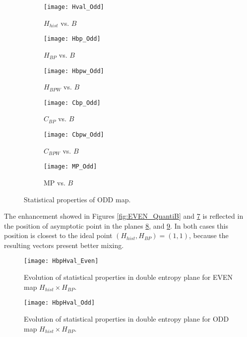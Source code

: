 %
\begin{figure}[H]
	\centering
	\begin{subfigure}[b]{0.49\textwidth}
		\texttt{[image: Hval\_Odd]}
		\caption{$H_{hist}$ vs. $B$}
		\label{fig:Hval_Odd}
	\end{subfigure}
	\begin{subfigure}[b]{0.49\textwidth}
		\texttt{[image: Hbp\_Odd]}
		\caption{$H_{BP}$ vs. $B$}
		\label{fig:Hbp_Odd}
	\end{subfigure}
	\begin{subfigure}[b]{0.49\textwidth}
		\texttt{[image: Hbpw\_Odd]}
		\caption{$H_{BPW}$ vs. $B$}
		\label{fig:Hbpw_Odd}
	\end{subfigure}
	\begin{subfigure}[b]{0.49\textwidth}
		\texttt{[image: Cbp\_Odd]}
		\caption{$C_{BP}$ vs. $B$}
		\label{fig:Cbp_Odd}
	\end{subfigure}
	\begin{subfigure}[b]{0.49\textwidth}
		\texttt{[image: Cbpw\_Odd]}
		\caption{$C_{BPW}$ vs. $B$}
		\label{fig:Cbpw_Odd}
	\end{subfigure}
	\begin{subfigure}[b]{0.49\textwidth}
		\texttt{[image: MP\_Odd]}
		\caption{MP vs. $B$}
		\label{fig:MP_Odd}
	\end{subfigure}
	\caption{Statistical properties of ODD map.}
	\label{fig:ODD_QuantiB}
\end{figure}

The enhancement showed in Figures \ref{fig:EVEN_QuantiB} and \ref{fig:ODD_QuantiB} is reflected in the position of asymptotic point in the planes \ref{fig:EVEN_HH}, and \ref{fig:ODD_HH}.
In both cases this position is closest to the ideal point $(H_{hist}, H_{BP})=(1, 1)$, because the resulting vectors present better mixing.
%
\begin{figure}[H]
	\centering
	\texttt{[image: HbpHval\_Even]}
	\caption{Evolution of statistical properties in double entropy plane for EVEN map $H_{hist} \times H_{BP}$.}
	\label{fig:EVEN_HH}
\end{figure}
%
\begin{figure}[H]
	\centering
	\texttt{[image: HbpHval\_Odd]}
	\caption{Evolution of statistical properties in double entropy plane for ODD map $H_{hist} \times H_{BP}$.}
	\label{fig:ODD_HH}
\end{figure}

